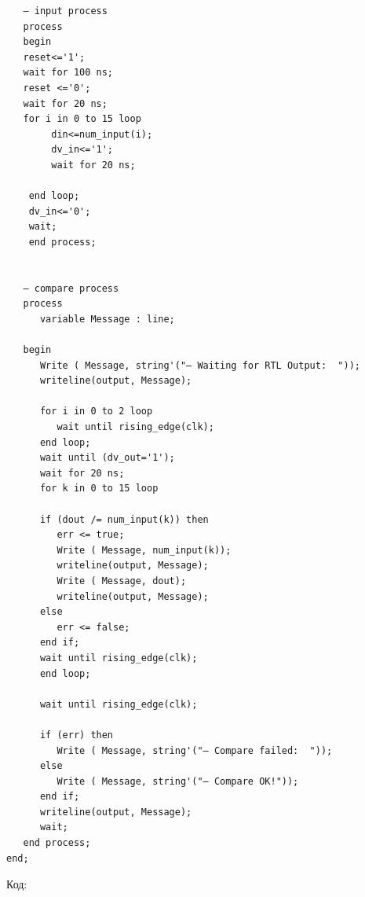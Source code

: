 \begin{Code}
\begin{lstlisting}
   — input process
   process
   begin
   reset<='1';
   wait for 100 ns;
   reset <='0';
   wait for 20 ns;
   for i in 0 to 15 loop
        din<=num_input(i);
        dv_in<='1';
        wait for 20 ns;
        
    end loop;
    dv_in<='0';
    wait;
    end process;


   — compare process
   process
      variable Message : line;   
      
   begin
      Write ( Message, string'("— Waiting for RTL Output:  "));
      writeline(output, Message);   

      for i in 0 to 2 loop
         wait until rising_edge(clk); 
      end loop;  
      wait until (dv_out='1');  
      wait for 20 ns;
      for k in 0 to 15 loop
            
      if (dout /= num_input(k)) then
         err <= true; 
         Write ( Message, num_input(k));
         writeline(output, Message);
         Write ( Message, dout);
         writeline(output, Message);
      else 
         err <= false;
      end if;
      wait until rising_edge(clk); 
      end loop;

      wait until rising_edge(clk); 

      if (err) then
         Write ( Message, string'("— Compare failed:  "));
      else 
         Write ( Message, string'("— Compare OK!"));
      end if;
      writeline(output, Message);
      wait;
   end process;
end;      
\end{lstlisting}
\end{Code}

Код:


